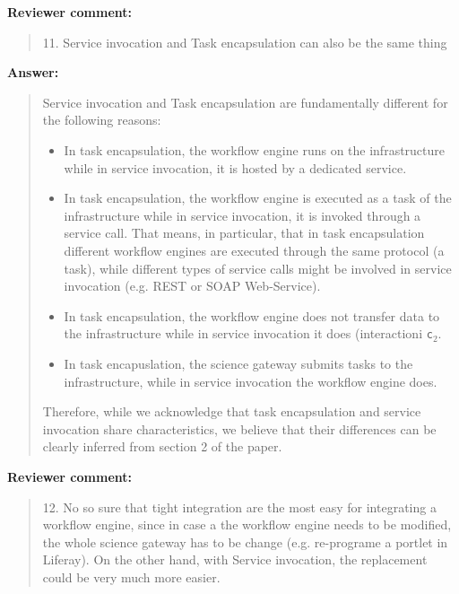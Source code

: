 \documentclass[a4]{article}
\newenvironment{review}%
{\textbf{Reviewer comment:}\begin{quote}}%
{\end{quote}}%
\newenvironment{answer}%
{\textbf{Answer:}\begin{small}\begin{quote}}%
{\end{quote}\end{small}}%
\begin{document}
\begin{review}
  11. Service invocation and Task encapsulation can also be the same
  thing
\end{review}

\begin{answer}
  Service invocation and Task encapsulation are fundamentally different for the following reasons:
  \begin{itemize}
  \item In task encapsulation, the workflow engine runs on the infrastructure while in service invocation, it is hosted by a dedicated service.
  \item In task encapsulation, the workflow engine is executed as a task of the infrastructure while in service invocation, it is invoked through a service call. That means, in particular, that in task encapsulation different workflow engines are executed through the same protocol (a task), while different types of service calls might be involved in service invocation (e.g. REST or SOAP Web-Service).
  \item In task encapsulation, the workflow engine does not transfer data to the infrastructure while in service invocation it does (interactioni \texttt{c$_2$}.
  \item In task encapuslation, the science gateway submits tasks to the infrastructure, while in service invocation the workflow engine does.
  \end{itemize}
  Therefore, while we acknowledge that task encapsulation and service
  invocation share characteristics, we believe that their differences
  can be clearly inferred from section 2 of the paper. 
\end{answer}

\begin{review}
12. No so sure that tight integration are the most easy for
integrating a workflow engine, since in case a the workflow engine
needs to be modified, the whole science gateway has to be change
(e.g. re-programe a portlet in Liferay). On the other hand, with
Service invocation, the replacement could be very much more easier.
\end{review}
\end{document}
